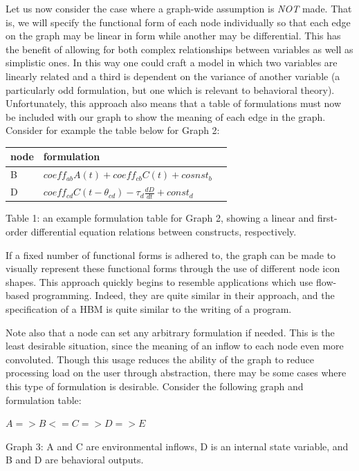 \documentclass[conference]{IEEEtran}
\begin{document}
Let us now consider the case where a graph-wide assumption is \emph{NOT} made.
That is, we will specify the functional form of each node individually so that each edge on the graph may be linear in form while another may be differential.
This has the benefit of allowing for both complex relationships between variables as well as simplistic ones.
In this way one could craft a model in which two variables are linearly related and a third is dependent on the variance of another variable (a particularly odd formulation, but one which is relevant to behavioral theory).
Unfortunately, this approach also means that a table of formulations must now be included with our graph to show the meaning of each edge in the graph.
Consider for example the table below for Graph 2:

\begin{centering}
  \begin{tabular}{ | l | l | l |}
      \hline
      node & formulation \\ \hline
      B & $coeff_{ab}A(t) + coeff_{cb}C(t) + cosnst_b$  \\ \hline
      D & $coeff_{cd}C(t-\theta_{cd}) - \tau_{d}\frac{dD}{dt} + const_d$ \\ \hline
  \end{tabular}
  
  Table 1: an example formulation table for Graph 2, showing a linear and first-order differential equation relations between constructs, respectively.
\end{centering}


If a fixed number of functional forms is adhered to, the graph can be made to visually represent these functional forms through the use of different node icon shapes. 
This approach quickly begins to resemble applications which use flow-based programming. 
Indeed, they are quite similar in their approach, and the specification of a HBM is quite similar to the writing of a program.

Note also that a node can set any arbitrary formulation if needed. 
This is the least desirable situation, since the meaning of an inflow to each node even more convoluted. 
Though this usage reduces the ability of the graph to reduce processing load on the user through abstraction, there may be some cases where this type of formulation is desirable. 
Consider the following graph and formulation table:

$A => B <= C => D => E$

Graph 3: A and C are environmental inflows, D is an internal state variable, and B and D are behavioral outputs.
\end{document}
